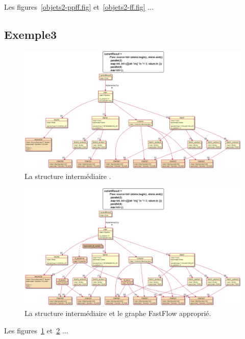Les figures~\ref{objets2-ppff.fig} et~\ref{objets2-ff.fig} ...

\subsection{Exemple3}

\begin{figure}
\centering
         \includegraphics[width=1.0\textwidth]{Figures/objets3-ppff.png}
      \caption{La structure interm\'ediaire .}
       \label{objets3-ppff.fig}
\end{figure}

\begin{figure}
\centering
         \includegraphics[width=1.0\textwidth]{Figures/objets3-ff.png}
      \caption{La structure interm\'ediaire  et le graphe FastFlow appropri\'e.}
       \label{objets3-ff.fig}
\end{figure}

Les figures~\ref{objets3-ppff.fig} et~\ref{objets3-ff.fig} ...
